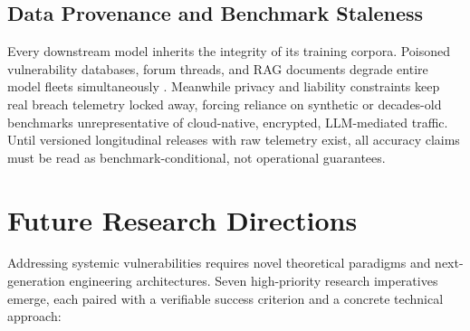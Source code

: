 \documentclass[conference,10pt,twocolumn,a4paper]{IEEEtran}
\begin{document}
\subsection{Data Provenance and Benchmark Staleness}
Every downstream model inherits the integrity of its training corpora. Poisoned vulnerability databases, forum threads, and RAG documents degrade entire model fleets simultaneously \cite{nist_sp_ai_100_2e2025, mirsky2018kitsune}. Meanwhile privacy and liability constraints keep real breach telemetry locked away, forcing reliance on synthetic or decades-old benchmarks unrepresentative of cloud-native, encrypted, LLM-mediated traffic. Until versioned longitudinal releases with raw telemetry exist, all accuracy claims must be read as benchmark-conditional, not operational guarantees.

\section{Future Research Directions}
\label{sec:future}
Addressing systemic vulnerabilities requires novel theoretical paradigms and next-generation engineering architectures. Seven high-priority research imperatives emerge, each paired with a verifiable success criterion and a concrete technical approach:
\end{document}
